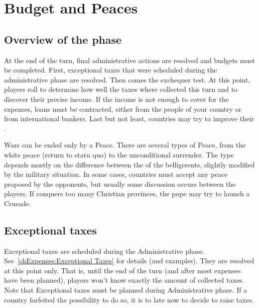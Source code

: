
\chapter{Budget and Peaces}\label{chapter:Peace}

\section{Overview of the phase}

\aparag[Administration] At the end of the turn, final administrative actions
are resolved and budgets must be completed. First, exceptional taxes that were
scheduled during the administrative phase are resolved. Then comes the
exchequer test. At this point, players roll to determine how well the taxes
where collected this turn and to discover their precise income. If the income
is not enough to cover for the expenses, loans must be contracted, either from
the people of your country or from international bankers. Last but not least,
countries may try to improve their \STAB.

\aparag[Peace] Wars can be ended only by a Peace. There are several types of
Peace, from the white peace (return to statu quo) to the unconditional
surrender. The type depends mostly on the difference between the \STAB of the
belligerents, slightly modified by the military situation. In some cases,
countries must accept any peace proposed by the opponents, but usually some
discussion occurs between the players.
\bparag[Crusade] If \TUR conquers too many Christian provinces, the pope may
try to launch a Crusade. 


\PeaceDetails

\section{Exceptional taxes}\label{chPeace:Exceptional taxes}
 Exceptional taxes are scheduled during the
Administrative phase. See~\ref{chExpenses:Exceptional Taxes} for details (and
examples). They are resolved at this point only. That is, until the end of the
turn (and after most expenses have been planned), players won't know exactly
the amount of collected taxes.
\bparag Note that Exceptional taxes must be planned during Administrative
phase. If a country forfeited the possibility to do so, it is to late now to
decide to raise taxes.

